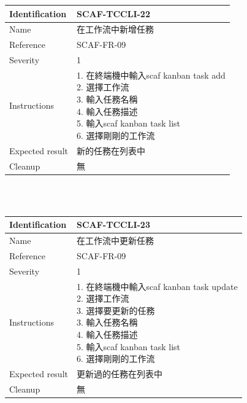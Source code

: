\documentclass{report}
\begin{document}
\begin{tabularx}{\textwidth}{
  |p{}%
  |p{}|%
  }
  \hline
  \centering Identification &  SCAF-TCCLI-22 \\
  \hline
  \centering Name & 在工作流中新增任務 \\
  \hline
  \centering Reference & SCAF-FR-09 \\
  \hline
  \centering Severity & 1 \\
  \hline
  \centering Instructions & 
  \makecell[l]{
    1. 在終端機中輸入scaf kanban task add \\
    2. 選擇工作流 \\
    3. 輸入任務名稱 \\
    4. 輸入任務描述 \\
    5. 輸入scaf kanban task list \\
    6. 選擇剛剛的工作流 \\
  }\\
  \hline
  \centering Expected result & 新的任務在列表中 \\
  \hline
  \centering Cleanup & 無 \\
  \hline
\end{tabularx}
\\
\newline
\\

\begin{tabularx}{\textwidth}{
  |p{}%
  |p{}|%
  }
  \hline
  \centering Identification &  SCAF-TCCLI-23 \\
  \hline
  \centering Name & 在工作流中更新任務 \\
  \hline
  \centering Reference & SCAF-FR-09 \\
  \hline
  \centering Severity & 1 \\
  \hline
  \centering Instructions & 
  \makecell[l]{
    1. 在終端機中輸入scaf kanban task update \\
    2. 選擇工作流 \\
    3. 選擇要更新的任務 \\
    3. 輸入任務名稱 \\
    4. 輸入任務描述 \\
    5. 輸入scaf kanban task list \\
    6. 選擇剛剛的工作流 \\
  }\\
  \hline
  \centering Expected result & 更新過的任務在列表中 \\
  \hline
  \centering Cleanup & 無 \\
  \hline
\end{tabularx}
\\
\newline
\\
\end{document}
